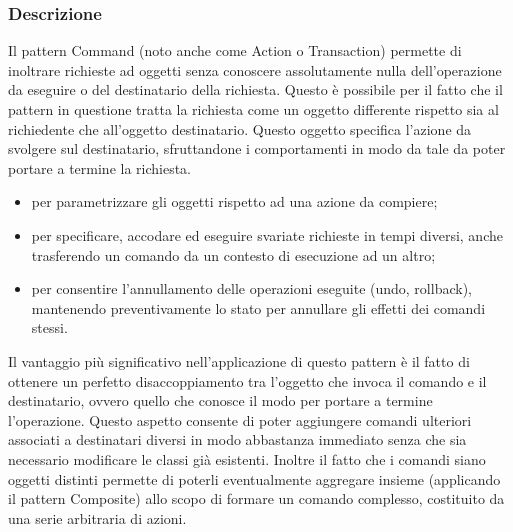\documentclass[a4paper,10pt]{article}
\begin{document}
                        \subsubsection{Descrizione}
                        Il pattern Command (noto anche come Action o Transaction) permette di inoltrare richieste ad oggetti senza conoscere assolutamente nulla dell’operazione da eseguire o del destinatario della richiesta. Questo è possibile per il fatto che il pattern in questione tratta la richiesta come un oggetto differente rispetto sia al richiedente che all’oggetto destinatario. Questo oggetto specifica l’azione da svolgere sul destinatario, sfruttandone i comportamenti in modo da tale da poter portare a termine la richiesta.
                        \begin{itemize}
                            \item per parametrizzare gli oggetti rispetto ad una azione da compiere;                            
                            \item per specificare, accodare ed eseguire svariate richieste in tempi diversi, anche trasferendo un comando da un contesto di esecuzione ad un altro;
                            \item per consentire l’annullamento delle operazioni eseguite (undo, rollback), mantenendo preventivamente lo stato per annullare gli effetti dei comandi stessi.
                        \end{itemize}
                        Il vantaggio più significativo nell’applicazione di questo pattern è il fatto di ottenere un perfetto disaccoppiamento tra l’oggetto che invoca il comando e il destinatario, ovvero quello che conosce il modo per portare a termine l’operazione. Questo aspetto consente di poter aggiungere comandi ulteriori associati a destinatari diversi in modo abbastanza immediato senza che sia necessario modificare le classi già esistenti. Inoltre il fatto che i comandi siano oggetti distinti permette di poterli eventualmente aggregare insieme (applicando il pattern Composite) allo scopo di formare un comando complesso, costituito da una serie arbitraria di azioni.
\end{document}

